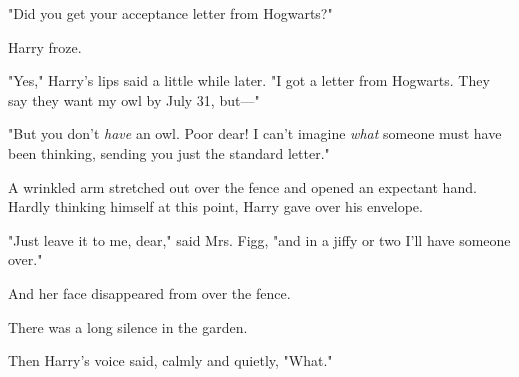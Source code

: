 "Did you get your acceptance letter from Hogwarts?"

Harry froze.

"Yes," Harry's lips said a little while later. "I got a letter
from Hogwarts. They say they want my owl by July 31, but—"

"But you don't \emph{have} an owl. Poor dear! I can't imagine
\emph{what} someone must have been thinking, sending you just
the standard letter."

A wrinkled arm stretched out over the fence and opened
an expectant hand. Hardly thinking himself at this point,
Harry gave over his envelope.

"Just leave it to me, dear," said Mrs. Figg, "and in a jiffy
or two I'll have someone over."

And her face disappeared from over the fence.

There was a long silence in the garden.

Then Harry's voice said, calmly and quietly, "What."
